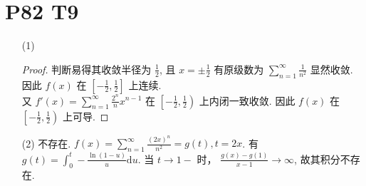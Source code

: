 \documentclass{article}
\begin{document}
\section*{P82 T9}

\begin{itemize}
    \item [(1)] \begin{proof}
        判断易得其收敛半径为 $\frac{1}{2}$, 且 $x = \pm \frac{1}{2}$ 有原级数为 $\sum_{n = 1}^{\infty}\frac{1}{n^2}$ 显然收敛. 因此 $f(x)$ 在 $\left[-\frac{1}{2}, \frac{1}{2}\right]$ 上连续. \\
        又 $f'(x) = \sum_{n = 1}^{\infty}\frac{2^n}{n}x^{n - 1}$ 在 $\left[-\frac{1}{2}, \frac{1}{2}\right)$ 上内闭一致收敛. 因此 $f(x)$ 在 $\left[-\frac{1}{2}, \frac{1}{2}\right)$ 上可导.
    \end{proof}
    \item [(2)] 不存在. $f(x) = \sum_{n = 1}^{\infty}\frac{(2x)^n}{n^2} = g(t), t = 2x$. 有 $g(t) = \int_{0}^{t}-\frac{\ln (1 - u)}{u}\mathrm{d}u$. 当 $t \to 1-$ 时， $\frac{g(x) - g(1)}{x - 1} \to \infty$, 故其积分不存在.
\end{itemize}
\end{document}
